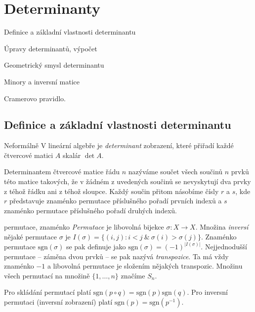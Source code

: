 \def\sgn{\mathrm{sgn}}
\def\adj{\mathrm{adj\ }}

\section{Determinanty}

\begin{pozadavky}
\begin{pitemize}
\item Definice a základní vlastnosti determinantu
\item Úpravy determinantů, výpočet
\item Geometrický smysl determinantu
\item Minory a inversní matice
\item Cramerovo pravidlo.
\end{pitemize}
\end{pozadavky}

\subsection{Definice a základní vlastnosti determinantu}

\begin{obecne}{Neformálně}
V lineární algebře je \emph{determinant} zobrazení, které přiřadí každé čtvercové matici $A$ skalár $\det A$.

Determinantem čtvercové matice řádu $n$ nazýváme součet všech součinů $n$ prvků této matice takových, že v žádném z uvedených součinů se nevyskytují dva prvky z téhož řádku ani z téhož sloupce. Každý součin přitom násobíme čísly $r$ a $s$, kde $r$ představuje znaménko permutace příslušného pořadí prvních indexů a $s$ znaménko permutace příslušného pořadí druhých indexů.
\end{obecne}

\begin{definiceN}{permutace, znaménko}
\emph{Permutace} je libovolná bijekce $\sigma:X\to X$. Množina \emph{inversí} nějaké permutace $\sigma$ je $I(\sigma)=\{(i,j):i<j \ \&\ \sigma(i)>\sigma(j)\}$. Znaménko permutace $\sgn(\sigma)$ se pak definuje jako $\sgn(\sigma)=(-1)^{|I(\sigma)|}$. Nejjednodušší permutace -- záměna dvou prvků -- se pak nazývá \emph{transpozice}. Ta má vždy znaménko $-1$ a libovolná permutace je složením nějakých transpozic. Množinu všech permutací na množině $\{1,\dots,n\}$ značíme $S_n$.
\end{definiceN}

\begin{poznamka}
Pro skládání permutací platí $\sgn(p\circ q)=\sgn(p)\sgn(q)$. Pro inversní permutaci (inversní zobrazení) platí $\sgn(p)=\sgn(p^{-1})$.
\end{poznamka}

